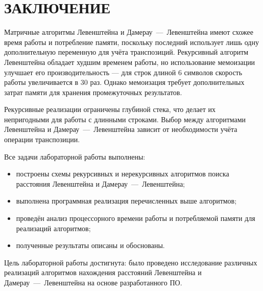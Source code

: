 \chapter*{ЗАКЛЮЧЕНИЕ}

Матричные алгоритмы Левенштейна и Дамерау~–--~Левенштейна имеют схожее время работы и потребление памяти, поскольку последний использует лишь одну дополнительную переменную для учёта транспозиций. Рекурсивный алгоритм Левенштейна обладает худшим временем работы, но использование мемоизации улучшает его производительность --- для строк длиной 6 символов скорость работы увеличивается в 30 раз. Однако мемоизация требует дополнительных затрат памяти для хранения промежуточных результатов.

Рекурсивные реализации ограничены глубиной стека, что делает их непригодными для работы с длинными строками. Выбор между алгоритмами Левенштейна и Дамерау~---~Левенштейна зависит от необходимости учёта операции транспозиции.

Все задачи лабораторной работы выполнены: 

\begin{itemize}[label=--]
	\item построены схемы рекурсивных и нерекурсивных алгоритмов поиска расстояния Левенштейна и Дамерау~---~Левенштейна;
	\item выполнена программная реализация перечисленных выше алгоритмов;
	\item проведён анализ процессорного времени работы и потребляемой памяти для реализаций алгоритмов;
        \item полученные результаты описаны и обоснованы.
\end{itemize}

Цель лабораторной работы достигнута: было проведено исследование различных реализаций алгоритмов нахождения расстояний Левенштейна и Дамерау~---~Левенштейна на основе разработанного ПО. 
